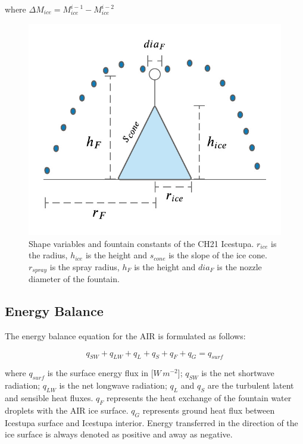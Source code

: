 \documentclass[utf8]{frontiersSCNS} %
\begin{document}
where $\Delta M_{ice} = M_{ice}^{i-1} - M_{ice}^{i-2}$

    \begin{figure} \begin{center} \includegraphics[width=10
cm]{Figures/Figure_5.jpg} \end{center} \caption{Shape variables and fountain constants of the CH21 Icestupa. $r_{ice}$ is
the radius, $h_{ice}$ is the height and $s_{cone}$ is the slope of the ice cone. $r_{spray}$ is the spray radius, $h_F$ is the
height and $dia_F$ is the nozzle diameter of the fountain.} \label{fig:shape} \end{figure}

\subsection{Energy Balance} \label{section:EB}

The energy balance equation \citep{Hock_2005} for the AIR is formulated as follows:

\begin{equation} q_{SW} + q_{LW} + q_{L} + q_{S} + q_{F} + q_{G} = q_{surf} \label{eqn:EB} \end{equation}

where $q_{surf}$ is the surface energy flux in [$W\,m^{-2}$]; $q_{SW}$ is the net shortwave radiation; $q_{LW}$ is the
net longwave radiation; $q_{L}$ and $q_{S}$ are the turbulent latent and sensible heat fluxes. $q_{F}$ represents the heat
exchange of the fountain water droplets with the AIR ice surface. $q_{G}$ represents ground heat flux between Icestupa
surface and Icestupa interior. Energy transferred in the direction of the ice surface is always denoted as positive and
away as negative.  
\end{document}
